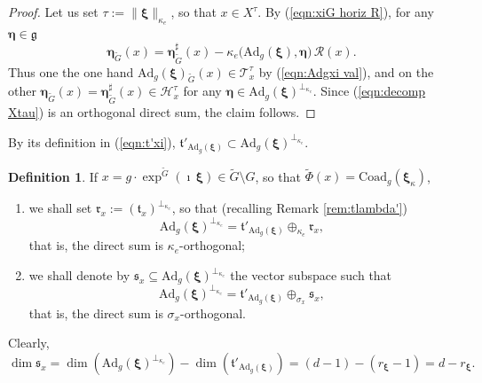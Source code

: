 \documentclass[12pt,a4paper]{article}
\theoremstyle{plain}
\theoremstyle{definition}
\newtheorem{defn}[thm]{Definition}%
\begin{document}
\begin{proof}
Let us set $\tau:=\|\boldsymbol{\xi}\|_{\kappa_e}$,
so that $x\in X^\tau$. By (\ref{eqn:xiG horiz R}), for any
$\boldsymbol{\eta}\in \mathfrak{g}$
\begin{equation}
\label{eqn:xiG horiz Rx}
\boldsymbol{\eta}_{\tilde{G}}(x)=\boldsymbol{\eta}_{\tilde{G}}^\sharp(x)
-\kappa_e\big(\mathrm{Ad}_g(\boldsymbol{\xi}),\boldsymbol{\eta}  \big)
\,\mathcal{R}(x).
\end{equation}
Thus one the one hand
$\mathrm{Ad}_g(\boldsymbol{\xi})_{\tilde{G}}\left(x  \right)\in \mathcal{T}^\tau_x$ by (\ref{eqn:Adgxi val}), and on the other
$\boldsymbol{\eta}_{\tilde{G}}(x)=\boldsymbol{\eta}_{\tilde{G}}^\sharp(x)
\in \mathcal{H}^\tau_x$ for any $\boldsymbol{\eta}\in 
\mathrm{Ad}_g(\boldsymbol{\xi})^{\perp_{\kappa_e}}$.
Since (\ref{eqn:decomp Xtau}) is an orthogonal direct sum, the claim follows.


\end{proof}


By its definition in  (\ref{eqn:t'xi}), $\mathfrak{t}'_{\mathrm{Ad}_g(\boldsymbol{\xi})}\subset
\mathrm{Ad}_g(\boldsymbol{\xi})^{\perp_{\kappa_e}}$.

\begin{defn}
\label{defn:sfrakx}
If $x=g\cdot\exp^{\tilde{G}}(\imath\,\boldsymbol{\xi})\in \tilde{G}\setminus G$, so that
$\tilde{\Phi}(x)=\mathrm{Coad}_g(\boldsymbol{\xi}_\kappa)$,
\begin{enumerate}
\item we shall set 
$\mathfrak{r}_x:=
(\mathfrak{t}_x)^{\perp_{\kappa_e}}$,
so that (recalling Remark \ref{rem:tlambda'})
$$
\mathrm{Ad}_g(\boldsymbol{\xi})^{\perp_{\kappa_e}}
=\mathfrak{t}'_{\mathrm{Ad}_g(\boldsymbol{\xi})}
\oplus_{\kappa_e}
\mathfrak{r}_x,
$$
that is, the direct sum is $\kappa_e$-orthogonal;

\item we shall denote by
$\mathfrak{s}_x\subseteq \mathrm{Ad}_g(\boldsymbol{\xi})^{\perp_{\kappa_e}}$
the vector subspace such that
$$
\mathrm{Ad}_g(\boldsymbol{\xi})^{\perp_{\kappa_e}}
=\mathfrak{t}'_{\mathrm{Ad}_g(\boldsymbol{\xi})}
\oplus_{\sigma_x}
\mathfrak{s}_x,
$$
that is, the direct sum is $\sigma_x$-orthogonal.

\end{enumerate}


\end{defn}




Clearly,
$$
\dim \mathfrak{s}_x=\dim (\mathrm{Ad}_g(\boldsymbol{\xi})^{\perp_{\kappa_e}})-
\dim(\mathfrak{t}'_{\mathrm{Ad}_g(\boldsymbol{\xi})})=
(d-1)-(r_{\boldsymbol{\xi}}-1)=
d-r_{\boldsymbol{\xi}}.
$$
\end{document}
